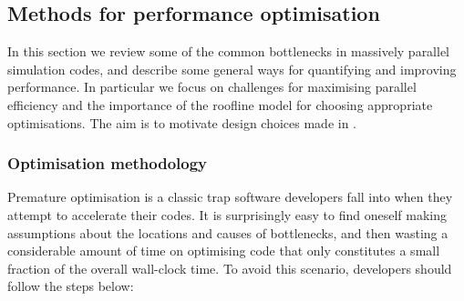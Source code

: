 \begin{figure}
\begin{subfigure}{0.45\textwidth}
      \caption{}
      \label{fig:orient_vector_flip}
    \end{subfigure}

    \caption{}
    \label{fig:orient}
\end{figure}

\subsection{Methods for performance optimisation}

In this section we review some of the common bottlenecks in massively parallel simulation codes, and describe some general ways for quantifying and improving performance.
In particular we focus on challenges for maximising parallel efficiency and the importance of the roofline model for choosing appropriate optimisations.
The aim is to motivate design choices made in .

\subsubsection{Optimisation methodology}

Premature optimisation is a classic trap software developers fall into when they attempt to accelerate their codes.
It is surprisingly easy to find oneself making assumptions about the locations and causes of bottlenecks, and then wasting a considerable amount of time on optimising code that only constitutes a small fraction of the overall wall-clock time.
To avoid this scenario, developers should follow the steps below:

